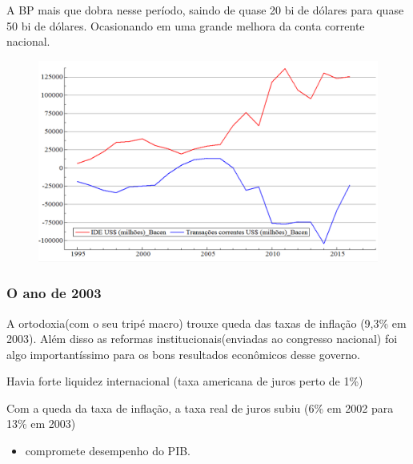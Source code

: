 \documentclass[a4paper,12pt]{article}[abntex2]
\begin{document}
A BP mais que dobra nesse período, saindo de quase 20 bi de dólares para quase 50 bi de dólares. Ocasionando em uma grande melhora da conta corrente nacional.

\begin{figure}[H]
    \centering
    \includegraphics[width=0.7\linewidth]{Imagens/a16i7.png}
\end{figure}

\subsubsection{\textbf{O ano de 2003}}
A ortodoxia(com o seu tripé macro) trouxe queda das taxas de inflação (9,3\% em 2003). Além disso as reformas institucionais(enviadas ao congresso nacional) foi algo importantíssimo para os bons resultados econômicos desse governo.

Havia forte liquidez internacional (taxa americana de juros perto de 1\%)

Com a queda da taxa de inflação, a taxa real de juros subiu (6\% em 2002 para 13\% em 2003)
\begin{itemize}
    \item compromete desempenho do PIB.
\end{itemize}
\end{document}
